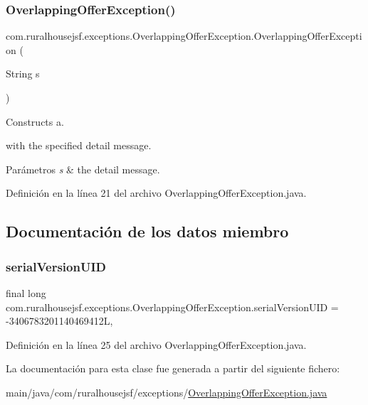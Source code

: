 \subsubsection{\texorpdfstring{OverlappingOfferException()}{OverlappingOfferException()}\hspace{0.1cm}{\footnotesize\ttfamily [2/2]}}
{\footnotesize\ttfamily com.\+ruralhousejsf.\+exceptions.\+Overlapping\+Offer\+Exception.\+Overlapping\+Offer\+Exception (\begin{DoxyParamCaption}\item[{String}]{s }\end{DoxyParamCaption})}



Constructs a. 


\begin{DoxyCode}{0}
\end{DoxyCode}
 with the specified detail message.


\begin{DoxyParams}{Parámetros}
{\em s} & the detail message. \\
\hline
\end{DoxyParams}


Definición en la línea 21 del archivo Overlapping\+Offer\+Exception.\+java.



\subsection{Documentación de los datos miembro}
\mbox{\label{a00212_aaff379d27ee36188b92cd4ed2ee2010e}} 
\subsubsection{\texorpdfstring{serialVersionUID}{serialVersionUID}}
{\footnotesize\ttfamily final long com.\+ruralhousejsf.\+exceptions.\+Overlapping\+Offer\+Exception.\+serial\+Version\+U\+ID = -\/3406783201140469412L\hspace{0.3cm}{\ttfamily [static]}, {\ttfamily [private]}}



Definición en la línea 25 del archivo Overlapping\+Offer\+Exception.\+java.



La documentación para esta clase fue generada a partir del siguiente fichero\+:\begin{DoxyCompactItemize}
\item 
main/java/com/ruralhousejsf/exceptions/\mbox{\hyperlink{a00065}{Overlapping\+Offer\+Exception.\+java}}\end{DoxyCompactItemize}
